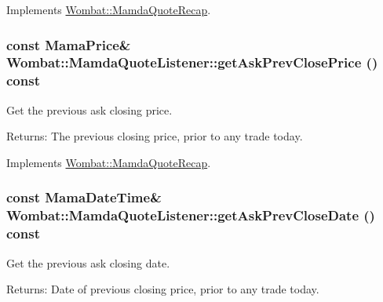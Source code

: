 Implements \hyperlink{classWombat_1_1MamdaQuoteRecap_4f95ffdb921180d5a7a5d6f488b6014c}{Wombat::Mamda\-Quote\-Recap}.\hypertarget{classWombat_1_1MamdaQuoteListener_e0afe79ab166febbcf94861365dc31c7}{
\subsubsection[getAskPrevClosePrice]{\setlength{\rightskip}{0pt plus 5cm}const Mama\-Price\& Wombat::Mamda\-Quote\-Listener::get\-Ask\-Prev\-Close\-Price () const}}
\label{classWombat_1_1MamdaQuoteListener_e0afe79ab166febbcf94861365dc31c7}


Get the previous ask closing price. 

\begin{Desc}
\item[Returns:]The previous closing price, prior to any trade today. \end{Desc}


Implements \hyperlink{classWombat_1_1MamdaQuoteRecap_521a7513135af4b11b964473ce74bc88}{Wombat::Mamda\-Quote\-Recap}.\hypertarget{classWombat_1_1MamdaQuoteListener_58dfc1cbbf19d48e01d51ee715256c15}{
\subsubsection[getAskPrevCloseDate]{\setlength{\rightskip}{0pt plus 5cm}const Mama\-Date\-Time\& Wombat::Mamda\-Quote\-Listener::get\-Ask\-Prev\-Close\-Date () const}}
\label{classWombat_1_1MamdaQuoteListener_58dfc1cbbf19d48e01d51ee715256c15}


Get the previous ask closing date. 

\begin{Desc}
\item[Returns:]Date of previous closing price, prior to any trade today. \end{Desc}


